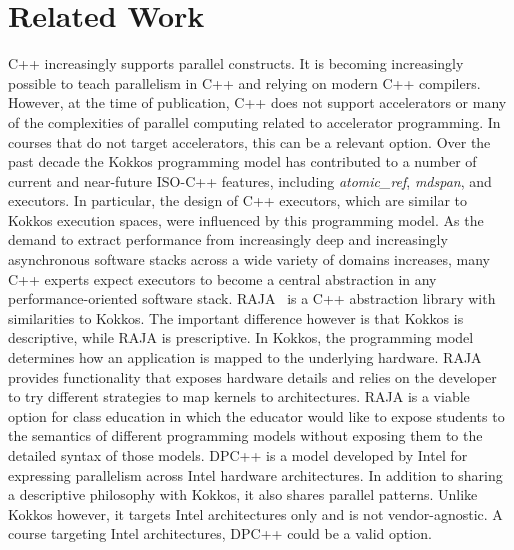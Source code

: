 \section{Related Work}\label{chap:related}

C++ increasingly supports parallel constructs. It is becoming increasingly possible to teach parallelism in C++ and relying on modern C++ compilers. However, at the time of publication, C++ does not support accelerators or many of the complexities of parallel computing related to accelerator programming. In courses that do not target accelerators, this can be a relevant option. Over the past decade the Kokkos programming model has contributed to a number of current and near-future ISO-C++ features, including \emph{atomic\_ref}\cite{wg21_p0019}, \emph{mdspan}\cite{MDSPAN}, and executors.  In particular, the design of C++ executors, which are similar to Kokkos execution spaces, were influenced by this programming model. As the demand to extract performance from increasingly deep and increasingly asynchronous software stacks across a wide variety of domains increases, many C++ experts expect executors to become a central abstraction in any performance-oriented software stack. 
RAJA~\cite{Raja} is a C++ abstraction library with similarities to Kokkos. The important difference however is that Kokkos is descriptive, while RAJA is prescriptive. In Kokkos, the programming model determines how an application is mapped to the underlying hardware. RAJA provides functionality that exposes hardware details and relies on the developer to try different strategies to map kernels to architectures. RAJA is a viable option for class education in which the educator would like to expose students to the semantics of different programming models without exposing them to the detailed syntax of those models.
DPC++\cite{DPCPP} is a model developed by Intel\textsuperscript{\textregistered} for expressing parallelism across Intel hardware architectures. In addition to sharing a descriptive philosophy with Kokkos, it also shares parallel patterns. Unlike Kokkos however, it targets Intel architectures only and is not vendor-agnostic. A course targeting Intel architectures, DPC++ could be a valid option.



